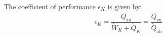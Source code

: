 The coefficient of performance \( \epsilon_K \) is given by:  
\[
\epsilon_K = \frac{\dot{Q}_{\text{zu}}}{\dot{W}_K + \dot{Q}_K} = \frac{\dot{Q}_{\text{zu}}}{\dot{Q}_{\text{ab}}}
\]